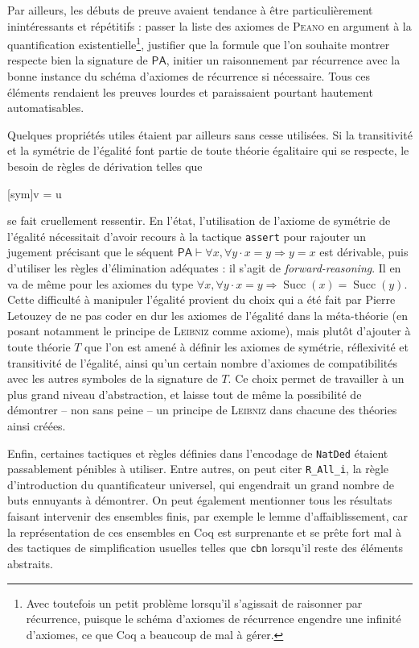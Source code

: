 \documentclass[a4paper]{article}
\DeclareMathOperator{\Succ}{\mathrm{Succ}}
\newcommand{\PA}{\mathsf{PA}}
\theoremstyle{remark}
\theoremstyle{remark}
\theoremstyle{remark}
\theoremstyle{definition}
\theoremstyle{definition}
\theoremstyle{definition}
\begin{document}
Par ailleurs, les débuts de preuve avaient tendance à être particulièrement inintéressants et répétitifs : passer la liste des axiomes de \textsc{Peano} en argument à la quantification existentielle\footnote{Avec toutefois un petit problème lorsqu'il s'agissait de raisonner par récurrence, puisque le schéma d'axiomes de récurrence engendre une infinité d'axiomes, ce que Coq a beaucoup de mal à gérer.}, justifier que la formule que l'on souhaite montrer respecte bien la signature de $\PA$, initier un raisonnement par récurrence avec la bonne instance du schéma d'axiomes de récurrence si nécessaire. Tous ces éléments rendaient les preuves lourdes et paraissaient pourtant hautement automatisables.

Quelques propriétés utiles étaient par ailleurs sans cesse utilisées. Si la transitivité et la symétrie de l'égalité font partie de toute théorie égalitaire qui se respecte, le besoin de règles de dérivation telles que \begin{prooftree*}
[sym]{\Gamma \vdash v = u}
\end{prooftree*} se fait cruellement ressentir. En l'état, l'utilisation de l'axiome de symétrie de l'égalité nécessitait d'avoir recours à la tactique \verb+assert+ pour rajouter un jugement précisant que le séquent $\PA \vdash \forall x, \forall y \cdot x = y \Rightarrow y = x$ est dérivable, puis d'utiliser les règles d'élimination adéquates : il s'agit de \emph{forward-reasoning}. Il en va de même pour les axiomes du type $\forall x, \forall y \cdot x = y \Rightarrow \Succ (x) = \Succ (y)$. Cette difficulté à manipuler l'égalité provient du choix qui a été fait par Pierre Letouzey de ne pas coder en dur les axiomes de l'égalité dans la méta-théorie (en posant notamment le principe de \textsc{Leibniz} comme axiome), mais plutôt d'ajouter à toute théorie $T$ que l'on est amené à définir les axiomes de symétrie, réflexivité et transitivité de l'égalité, ainsi qu'un certain nombre d'axiomes de compatibilités avec les autres symboles de la signature de $T$. Ce choix permet de travailler à un plus grand niveau d'abstraction, et laisse tout de même la possibilité de démontrer -- non sans peine -- un principe de \textsc{Leibniz} dans chacune des théories ainsi créées.

Enfin, certaines tactiques et règles définies dans l'encodage de \verb+NatDed+ étaient passablement pénibles à utiliser. Entre autres, on peut citer \verb+R_All_i+, la règle d'introduction du quantificateur universel, qui engendrait un grand nombre de buts ennuyants à démontrer. On peut également mentionner tous les résultats faisant intervenir des ensembles finis, par exemple le lemme d'affaiblissement, car la représentation de ces ensembles en Coq est surprenante et se prête fort mal à des tactiques de simplification usuelles telles que \verb+cbn+ lorsqu'il reste des éléments abstraits.
\end{document}
